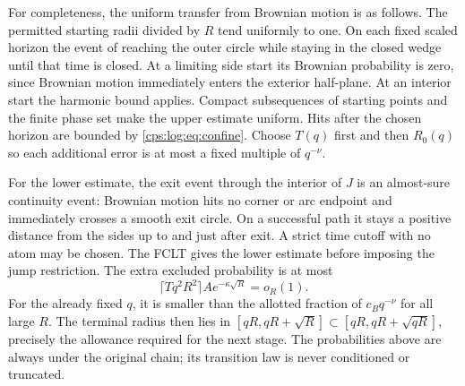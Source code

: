 \documentclass[11pt,letterpaper]{article}
\numberwithin{equation}{section}
\theoremstyle{remark}\newtheorem{remark}[theorem]{Remark}
\begin{document}
For completeness, the uniform transfer from Brownian motion is as
follows. The permitted starting radii divided by $R$ tend uniformly
to one. On each fixed scaled horizon the event of reaching the outer
circle while staying in the closed wedge until that time is closed.
At a limiting side start its Brownian probability is zero, since
Brownian motion immediately enters the exterior half-plane. At an
interior start the harmonic bound applies. Compact subsequences of
starting points and the finite phase set make the upper estimate
uniform. Hits after the chosen horizon are bounded by
\eqref{cps:log:eq:confine}. Choose $T(q)$ first and then $R_0(q)$ so each
additional error is at most a fixed multiple of $q^{-\nu}$.

For the lower estimate, the exit event through the interior of $J$
is an almost-sure continuity event: Brownian motion hits no corner or
arc endpoint and immediately crosses a smooth exit circle. On a
successful path it stays a positive distance from the sides up to and
just after exit. A strict time cutoff with no atom may be chosen.
The FCLT gives the lower estimate before imposing the jump restriction.
The extra excluded probability is at most
\begin{equation}\label{cps:log:eq:overshoot-error}
 \lceil Tq^2R^2\rceil A e^{-\kappa\sqrt R}=o_R(1).
\end{equation}
For the already fixed $q$, it is smaller than the allotted fraction
of $c_Bq^{-\nu}$ for all large $R$. The terminal radius then lies in
$[qR,qR+\sqrt R]\subset[qR,qR+\sqrt{qR}]$, precisely the allowance
required for the next stage. The probabilities above are always under
the original chain; its transition law is never conditioned or truncated.
\end{document}
